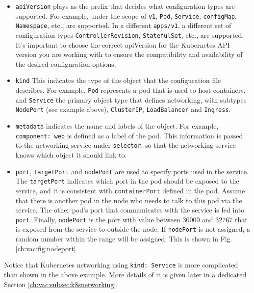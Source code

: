 \begin{itemize}
	\item \verb|apiVersion| plays as the prefix that decides what configuration types are supported. For example, under the scope of \verb|v1|, \verb|Pod|, \verb|Service|, \verb|configMap|, \verb|Namespace|, etc., are supported. In a different \verb|apps/v1|, a different set of configuration types \verb|ControllerRevision|, \verb|StatefulSet|, etc., are supported. It's important to choose the correct apiVersion for the Kubernetes API version you are working with to ensure the compatibility and availability of the desired configuration options.
	\item \verb|kind| This indicates the type of the object that the configuration file describes. For example, \verb|Pod| represents a pod that is used to host containers, and \verb|Service| the primary object type that defines networking, with subtypes \verb|NodePort| (see example above), \verb|ClusterIP|, \verb|LoadBalancer| and \verb|Ingress|.
	\item \verb|metadata| indicates the name and labels of the object. For example, \verb|component: web| is defined as a label of the pod. This information is passed to the networking service under \verb|selector|, so that the networking service knows which object it should link to.
	\item \verb|port|, \verb|targetPort| and \verb|nodePort| are used to specify ports used in the service. The \verb|targetPort| indicates which port in the pod should be exposed to the service, and it is consistent with \verb|containerPort| defined in the pod. Assume that there is another pod in the node who needs to talk to this pod via the service. The other pod's port that communicates with the service is fed into \verb|port|. Finally, \verb|nodePort| is the port with value between 30000 and 32767 that is exposed from the service to outside the node. If \verb|nodePort| is not assigned, a random number within the range will be assigned. This is shown in Fig. \ref{ch:vac:fig:nodeport}.
\end{itemize}
Notice that Kubernetes networking using \verb|kind: Service| is more complicated than shown in the above example. More details of it is given later in a dedicated Section \ref{ch:vac:subsec:k8snetworking}.


